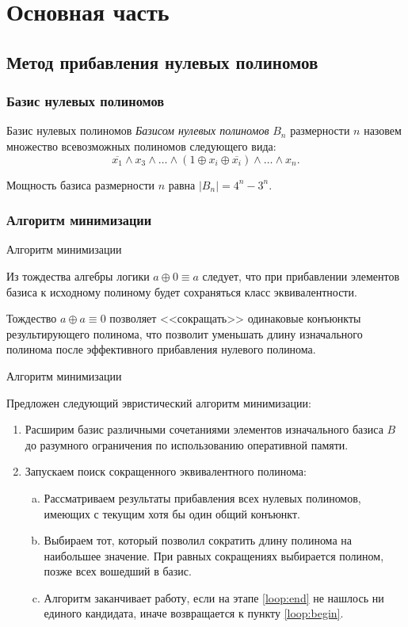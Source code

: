 \documentclass{beamer}
\begin{document}
\section{Основная часть}

\subsection{Метод прибавления нулевых полиномов}
\subsubsection{Базис нулевых полиномов}
\begin{frame}{Базис нулевых полиномов}
\textit{Базисом нулевых полиномов} $ B_n $ размерности $ n $ назовем множество всевозможных полиномов следующего вида:
$$ \overline{x_1} \land x_3 \land \dots \land ( 1 \oplus x_i \oplus \overline{x_i} ) \land \dots \land x_n. $$

Мощность базиса размерности $ n $ равна $ \left| B_n \right| = 4^n - 3^n $.

\end{frame}
\subsubsection{Алгоритм минимизации}
\begin{frame}{Алгоритм минимизации}

Из тождества алгебры логики $ a \oplus 0 \equiv a $ следует, что при прибавлении элементов базиса к исходному полиному будет сохраняться класс эквивалентности.

Тождество $ a \oplus a \equiv 0 $ позволяет <<сокращать>> одинаковые конъюнкты результирующего полинома, что позволит уменьшать длину изначального полинома после эффективного прибавления нулевого полинома.

\end{frame}
\begin{frame}{Алгоритм минимизации}

Предложен следующий эвристический алгоритм минимизации:
\begin{enumerate}
    \item Расширим базис различными сочетаниями элементов изначального базиса $ B $ до разумного ограничения по использованию оперативной памяти.
    \item Запускаем поиск сокращенного эквивалентного полинома:
    \begin{enumerate}[a.]
        \item \label{loop:begin} Рассматриваем результаты прибавления всех нулевых полиномов, имеющих с текущим хотя бы один общий конъюнкт.
        \item \label{loop:end} Выбираем тот, который позволил сократить длину полинома на наибольшее значение. При равных сокращениях выбирается полином, позже всех вошедший в базис.
        \item Алгоритм заканчивает работу, если на этапе \ref{loop:end} не нашлось ни единого кандидата, иначе возвращается к пункту \ref{loop:begin}.
    \end{enumerate}
\end{enumerate}

\end{frame}
\end{document}
